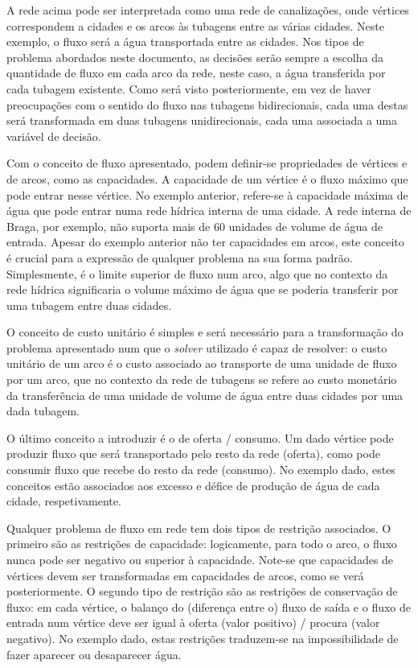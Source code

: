 \documentclass[12pt, a4paper, titlepage]{article}
\begin{document}
A rede acima pode ser interpretada como uma rede de canalizações, onde vértices correspondem a
cidades e os arcos às tubagens entre as várias cidades. Neste exemplo, o fluxo será a água
transportada entre as cidades. Nos tipos de problema abordados neste documento, as decisões serão
sempre a escolha da quantidade de fluxo em cada arco da rede, neste caso, a água transferida por
cada tubagem existente. Como será visto posteriormente, em vez de haver preocupações com o sentido
do fluxo nas tubagens bidirecionais, cada uma destas será transformada em duas tubagens
unidirecionais, cada uma associada a uma variável de decisão.

Com o conceito de fluxo apresentado, podem definir-se propriedades de vértices e de arcos, como as
capacidades. A capacidade de um vértice é o fluxo máximo que pode entrar nesse vértice. No exemplo
anterior, refere-se à capacidade máxima de água que pode entrar numa rede hídrica interna de uma
cidade. A rede interna de Braga, por exemplo, não suporta mais de 60 unidades de volume de água de
entrada. Apesar do exemplo anterior não ter capacidades em arcos, este conceito é crucial para a
expressão de qualquer problema na sua forma padrão. Simplesmente, é o limite superior de fluxo num
arco, algo que no contexto da rede hídrica significaria o volume máximo de água que se poderia
transferir por uma tubagem entre duas cidades.

O conceito de custo unitário é simples e será necessário para a transformação do problema
apresentado num que o \emph{solver} utilizado é capaz de resolver: o custo unitário de um arco é o
custo associado ao transporte de uma unidade de fluxo por um arco, que no contexto da rede de
tubagens se refere ao custo monetário da transferência de uma unidade de volume de água entre duas
cidades por uma dada tubagem.

O último conceito a introduzir é o de oferta / consumo. Um dado vértice pode produzir fluxo que será
transportado pelo resto da rede (oferta), como pode consumir fluxo que recebe do resto da rede
(consumo). No exemplo dado, estes conceitos estão associados aos excesso e défice de produção de
água de cada cidade, respetivamente.

Qualquer problema de fluxo em rede tem dois tipos de restrição associados. O primeiro são as
restrições de capacidade: logicamente, para todo o arco, o fluxo nunca pode ser negativo ou superior
à capacidade. Note-se que capacidades de vértices devem ser transformadas em capacidades de arcos,
como se verá posteriormente. O segundo tipo de restrição são as restrições de conservação de fluxo:
em cada vértice, o balanço do (diferença entre o) fluxo de saída e o fluxo de entrada num vértice
deve ser igual à oferta (valor positivo) / procura (valor negativo). No exemplo dado, estas
restrições traduzem-se na impossibilidade de fazer aparecer ou desaparecer água.
\end{document}
